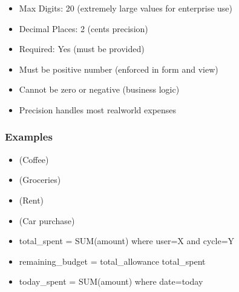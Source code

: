 \documentclass[letterpaper,10pt,english]{sphinxmanual}
\begin{document}
\begin{fulllineitems}
\begin{fulllineitems}
\begin{description}
\begin{itemize}
\item {} 
\sphinxAtStartPar
Max Digits: 20 (extremely large values \sphinxhyphen{} for enterprise use)

\item {} 
\sphinxAtStartPar
Decimal Places: 2 (cents precision)

\item {} 
\sphinxAtStartPar
Required: Yes (must be provided)

\end{itemize}

\begin{itemize}
\item {} 
\sphinxAtStartPar
Must be positive number (enforced in form and view)

\item {} 
\sphinxAtStartPar
Cannot be zero or negative (business logic)

\item {} 
\sphinxAtStartPar
Precision handles most real\sphinxhyphen{}world expenses

\end{itemize}

\end{description}
\subsubsection*{Examples}
\begin{itemize}
\item {} 
 (Coffee)

\item {} 
 (Groceries)

\item {} 
 (Rent)

\item {} 
 (Car purchase)

\end{itemize}
\begin{description}
\begin{itemize}
\item {} 
\sphinxAtStartPar
total\_spent = SUM(amount) where user=X and cycle=Y

\item {} 
\sphinxAtStartPar
remaining\_budget = total\_allowance \sphinxhyphen{} total\_spent

\item {} 
\sphinxAtStartPar
today\_spent = SUM(amount) where date=today


\end{itemize}
\end{description}
\end{fulllineitems}
\end{fulllineitems}
\end{document}

